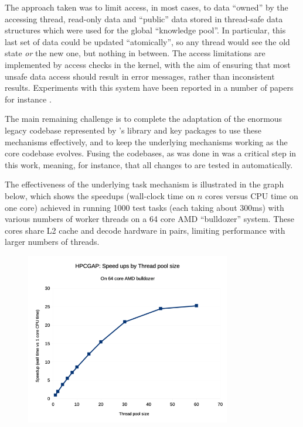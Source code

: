 \documentclass{deliverablereport}
\begin{document}
The approach taken was to limit access, in most cases, to
data ``owned'' by the accessing thread, read-only data and ``public''
data stored in thread-safe data structures which were used for the
global ``knowledge pool''. In particular, this last set of data could
be updated ``atomically'', so any thread would see the old state
\emph{or} the new one, but nothing in between. The access limitations are implemented by
access checks in the kernel, with the aim of ensuring that most unsafe
data access should result in error messages, rather than inconsistent
results. Experiments with this system have been reported in a number
of papers for instance \cite{something}.

The main remaining challenge is to complete the adaptation of the
enormous legacy codebase represented by \GAP's library and key
packages to use these mechanisms effectively, and to keep the
underlying mechanisms working as the core \GAP codebase
evolves. Fusing the codebases, as was done in  was a critical
step in this work, meaning, for instance, that all changes to \GAP are
tested in \HPCGAP automatically.

The effectiveness of the underlying task mechanism is illustrated in
the graph below, which shows the speedups (wall-clock time on $n$
cores versus CPU time on one core) achieved in running 1000 test tasks
(each taking about 300ms) with various numbers of worker threads on a 64
core AMD ``bulldozer'' system. These cores share L2 cache and decode
hardware in pairs, limiting performance with larger numbers of
threads.

\begin{figure}[!ht]
    \centering
    \includegraphics[width=0.8\textwidth]{images/hpcgap-speedups}
    \label{fig:hpcgap-speedups}
\end{figure}
\end{document}

